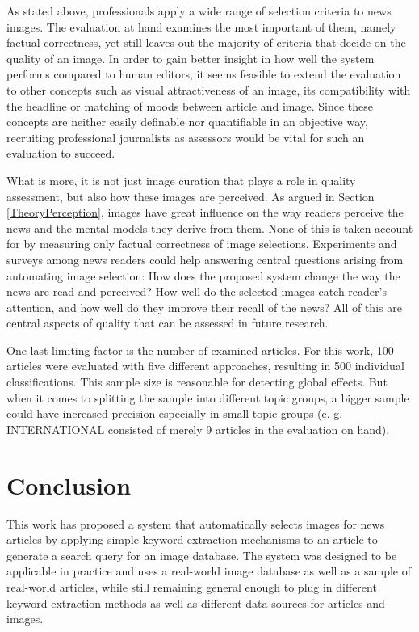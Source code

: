 \documentclass[11pt,a4paper,twoside]{article}
\begin{document}
As stated above, professionals apply a wide range of selection criteria to news images. The evaluation at hand examines the most important of them, namely factual correctness, yet still leaves out the majority of criteria that decide on the quality of an image. In order to gain better insight in how well the system performs compared to human editors, it seems feasible to extend the evaluation to other concepts such as visual attractiveness of an image, its compatibility with the headline or matching of moods between article and image. Since these concepts are neither easily definable nor quantifiable in an objective way, recruiting professional journalists as assessors would be vital for such an evaluation to succeed.

What is more, it is not just image curation that plays a role in quality assessment, but also how these images are perceived. As argued in Section \ref{TheoryPerception}, images have great influence on the way readers perceive the news and the mental models they derive from them. None of this is taken account for by measuring only factual correctness of image selections. Experiments and surveys among news readers could help answering central questions arising from automating image selection: How does the proposed system change the way the news are read and perceived? How well do the selected images catch reader's attention, and how well do they improve their recall of the news? All of this are central aspects of quality that can be assessed in future research.

One last limiting factor is the number of examined articles. For this work, 100 articles were evaluated with five different approaches, resulting in 500 individual classifications. This sample size is reasonable for detecting global effects. But when it comes to splitting the sample into different topic groups, a bigger sample could have increased precision especially in small topic groups (e. g. INTERNATIONAL consisted of merely 9 articles in the evaluation on hand).


\cleardoublepage

\section{Conclusion} \label{Conclusion}

This work has proposed a system that automatically selects images for news articles by applying simple keyword extraction mechanisms to an article to generate a search query for an image database. The system was designed to be applicable in practice and uses a real-world image database as well as a sample of real-world articles, while still remaining general enough to plug in different keyword extraction methods as well as different data sources for articles and images.
\end{document}
